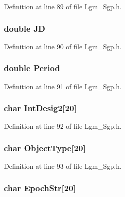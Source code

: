 Definition at line 89 of file Lgm\_\-Sgp.h.\hypertarget{struct___sgp_t_l_e_fca64005cd84fa9e811dac5219a618ad}{
\subsubsection[{JD}]{\setlength{\rightskip}{0pt plus 5cm}double {\bf JD}}}
\label{struct___sgp_t_l_e_fca64005cd84fa9e811dac5219a618ad}




Definition at line 90 of file Lgm\_\-Sgp.h.\hypertarget{struct___sgp_t_l_e_3a64c0f7b4ac76464f9118ce94ad8f3e}{
\subsubsection[{Period}]{\setlength{\rightskip}{0pt plus 5cm}double {\bf Period}}}
\label{struct___sgp_t_l_e_3a64c0f7b4ac76464f9118ce94ad8f3e}




Definition at line 91 of file Lgm\_\-Sgp.h.\hypertarget{struct___sgp_t_l_e_37b8c7421d0ac1fad2e300ce2f39d03c}{
\subsubsection[{IntDesig2}]{\setlength{\rightskip}{0pt plus 5cm}char {\bf IntDesig2}\mbox{[}20\mbox{]}}}
\label{struct___sgp_t_l_e_37b8c7421d0ac1fad2e300ce2f39d03c}




Definition at line 92 of file Lgm\_\-Sgp.h.\hypertarget{struct___sgp_t_l_e_70ff42494dd6b9ce04f0465a4cecc1bc}{
\subsubsection[{ObjectType}]{\setlength{\rightskip}{0pt plus 5cm}char {\bf ObjectType}\mbox{[}20\mbox{]}}}
\label{struct___sgp_t_l_e_70ff42494dd6b9ce04f0465a4cecc1bc}




Definition at line 93 of file Lgm\_\-Sgp.h.\hypertarget{struct___sgp_t_l_e_b6d6f17aac13c3765520b602f44b21be}{
\subsubsection[{EpochStr}]{\setlength{\rightskip}{0pt plus 5cm}char {\bf EpochStr}\mbox{[}20\mbox{]}}}
\label{struct___sgp_t_l_e_b6d6f17aac13c3765520b602f44b21be}




